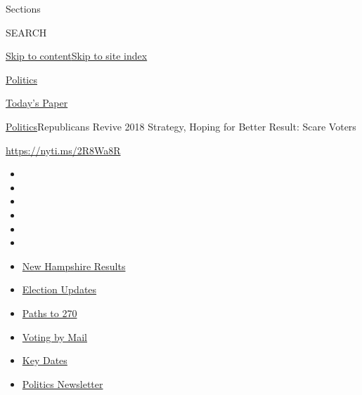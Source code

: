 Sections

SEARCH

\protect\hyperlink{site-content}{Skip to
content}\protect\hyperlink{site-index}{Skip to site index}

\href{https://www.nytimes3xbfgragh.onion/section/politics}{Politics}

\href{https://myaccount.nytimes3xbfgragh.onion/auth/login?response_type=cookie\&client_id=vi}{}

\href{https://www.nytimes3xbfgragh.onion/section/todayspaper}{Today's
Paper}

\href{/section/politics}{Politics}\textbar{}Republicans Revive 2018
Strategy, Hoping for Better Result: Scare Voters

\url{https://nyti.ms/2R8Wa8R}

\begin{itemize}
\item
\item
\item
\item
\item
\item
\end{itemize}

\begin{itemize}
\item
  \href{https://www.nytimes3xbfgragh.onion/interactive/2020/09/08/us/elections/results-new-hampshire-primary-elections.html?action=click\&pgtype=Article\&state=default\&region=TOP_BANNER\&context=storylines_menu}{New
  Hampshire Results}
\item
  \href{https://www.nytimes3xbfgragh.onion/live/2020/09/08/us/trump-vs-biden?action=click\&pgtype=Article\&state=default\&region=TOP_BANNER\&context=storylines_menu}{Election
  Updates}
\item
  \href{https://www.nytimes3xbfgragh.onion/interactive/2020/us/elections/election-states-biden-trump.html?action=click\&pgtype=Article\&state=default\&region=TOP_BANNER\&context=storylines_menu}{Paths
  to 270}
\item
  \href{https://www.nytimes3xbfgragh.onion/interactive/2020/08/31/us/politics/vote-by-mail-deadlines.html?action=click\&pgtype=Article\&state=default\&region=TOP_BANNER\&context=storylines_menu}{Voting
  by Mail}
\item
  \href{https://www.nytimes3xbfgragh.onion/interactive/2019/us/elections/2020-presidential-election-calendar.html?action=click\&pgtype=Article\&state=default\&region=TOP_BANNER\&context=storylines_menu}{Key
  Dates}
\item
  \href{https://www.nytimes3xbfgragh.onion/newsletters/politics?action=click\&pgtype=Article\&state=default\&region=TOP_BANNER\&context=storylines_menu}{Politics
  Newsletter}
\end{itemize}

